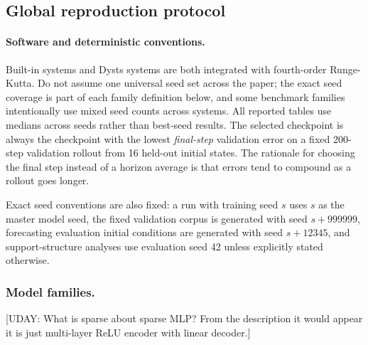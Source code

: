 \subsection{Global reproduction protocol}

\paragraph{Software and deterministic conventions.}
Built-in systems and Dysts systems are both integrated with fourth-order
Runge-Kutta. Do not assume one universal seed set across the paper; the exact
seed coverage is part of each family definition below, and some benchmark
families intentionally use mixed seed counts across systems. All reported
tables use medians across seeds rather than best-seed results. The selected
checkpoint is always the checkpoint with the lowest \emph{final-step} validation
error on a fixed 200-step validation rollout from 16 held-out initial states. The rationale for choosing the final step instead of a horizon average is that errors tend to compound as a rollout goes longer.

Exact seed conventions are also fixed: a run with training seed $s$ uses $s$
as the master model seed, the fixed validation corpus is generated with seed
$s + 999999$, forecasting evaluation initial conditions are generated with seed
$s + 12345$, and support-structure analyses use evaluation seed 42 unless
explicitly stated otherwise.

\subsubsection{Model families.}

{\color{red}[UDAY: What is sparse about sparse MLP? From the description it would appear it is just multi-layer ReLU encoder with linear decoder.]}

